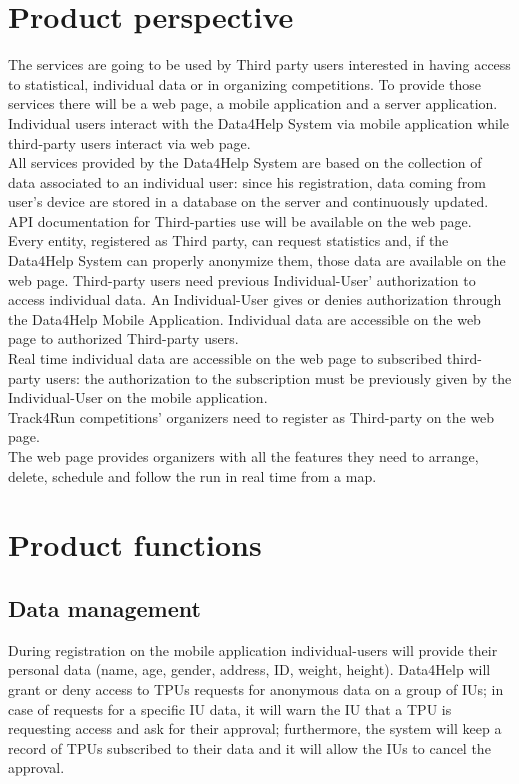 \section{Product perspective}
The services are going to be used by Third party users interested in having access to statistical, individual data or in organizing competitions. To provide those services there will be a web page, a mobile application and a server application.  \\
Individual users interact with the Data4Help System via mobile application while third-party users interact via web page. \\
All services provided by the Data4Help System are based on the collection of data associated to an individual user: since his registration, data coming from user’s device are stored in a database on the server and continuously updated. \\
API documentation for Third-parties use will be available on the web page. \\
Every entity, registered as Third party, can request statistics and, if the Data4Help System can properly anonymize them, those data are available on the web page.   
Third-party users need previous Individual-User’ authorization to access individual data. An Individual-User gives or denies authorization through the Data4Help Mobile Application. Individual data are accessible on the web page to authorized Third-party users.  \\
Real time individual data are accessible on the web page to subscribed third-party users: the authorization to the subscription must be previously given by the Individual-User on the mobile application.  \\
Track4Run competitions’ organizers need to register as Third-party on the web page. \\
The web page provides organizers with all the features they need to arrange, delete, schedule and follow the run in real time from a map. 

\section{Product functions}
\subsection{Data management}
During registration on the mobile application individual-users will provide their personal data (name, age, gender, address, ID, weight, height). Data4Help will grant or deny access to TPUs requests for anonymous data on a group of IUs; in case of requests for a specific IU data, it will warn the IU that a TPU is requesting access and ask for their approval; furthermore, the system will keep a record of TPUs subscribed to their data and it will allow the IUs to cancel the approval.
